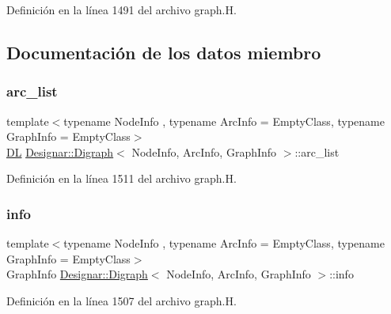 Definición en la línea 1491 del archivo graph.\+H.



\subsection{Documentación de los datos miembro}
\mbox{\label{class_designar_1_1_digraph_ad860dbe9732bc90906a486cad390637a}} 
\subsubsection{\texorpdfstring{arc\+\_\+list}{arc\_list}}
{\footnotesize\ttfamily template$<$typename Node\+Info , typename Arc\+Info  = Empty\+Class, typename Graph\+Info  = Empty\+Class$>$ \\
\hyperlink{class_designar_1_1_d_l}{DL} \hyperlink{class_designar_1_1_digraph}{Designar\+::\+Digraph}$<$ Node\+Info, Arc\+Info, Graph\+Info $>$\+::arc\+\_\+list\hspace{0.3cm}{\ttfamily [protected]}}



Definición en la línea 1511 del archivo graph.\+H.

\mbox{\label{class_designar_1_1_digraph_aec655bb1b26775cb7ad3581240290efe}} 
\subsubsection{\texorpdfstring{info}{info}}
{\footnotesize\ttfamily template$<$typename Node\+Info , typename Arc\+Info  = Empty\+Class, typename Graph\+Info  = Empty\+Class$>$ \\
Graph\+Info \hyperlink{class_designar_1_1_digraph}{Designar\+::\+Digraph}$<$ Node\+Info, Arc\+Info, Graph\+Info $>$\+::info\hspace{0.3cm}{\ttfamily [protected]}}



Definición en la línea 1507 del archivo graph.\+H.

\mbox{\label{class_designar_1_1_digraph_ac81c264dab34ca74fc62b0693c1c3543}} 
